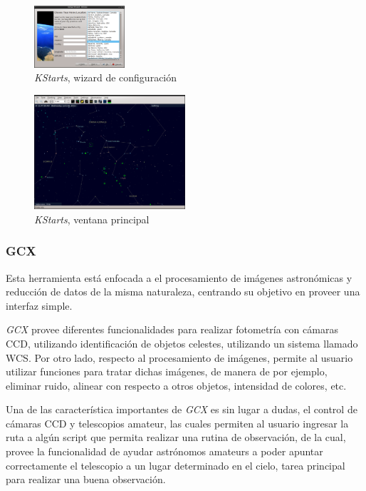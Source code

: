 \begin{figure}[!htb]
    \centering
    \includegraphics[width=0.3\textwidth]{img/kstars1}
    \caption{\emph{KStarts}, wizard de configuración}
    \label{fig:kstars1}
\end{figure}

\begin{figure}[!htb]
    \centering
    \includegraphics[width=0.5\textwidth]{img/kstars2}
    \caption{\emph{KStarts}, ventana principal}
    \label{fig:kstars2}
\end{figure}



\subsubsection{GCX}

Esta herramienta está enfocada a el procesamiento de imágenes astronómicas
y reducción de datos de la misma naturaleza, centrando su objetivo en proveer
una interfaz simple.

\emph{GCX} provee diferentes funcionalidades para realizar fotometría
con cámaras CCD, utilizando identificación de objetos celestes,
utilizando un sistema llamado WCS. Por otro lado, respecto al procesamiento
de imágenes, permite al usuario utilizar funciones para tratar dichas
imágenes, de manera de por ejemplo, eliminar ruido, alinear con respecto
a otros objetos, intensidad de colores, etc.

Una de las característica importantes de \emph{GCX} es sin lugar a dudas,
el control de cámaras CCD y telescopios amateur, las cuales
permiten al usuario ingresar la ruta a algún script que permita
realizar una rutina de observación, de la cual, provee la funcionalidad
de ayudar astrónomos amateurs a poder apuntar correctamente el telescopio
a un lugar determinado en el cielo, tarea principal para realizar
una buena observación.


